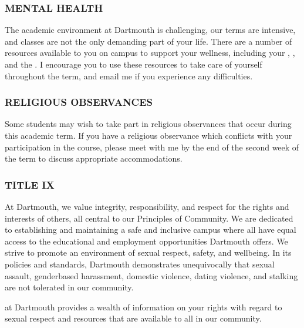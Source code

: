 \documentclass[letterpaper,10pt,english]{sphinxmanual}
\begin{document}
\subsubsection{MENTAL HEALTH}
\label{\detokenize{content/Syllabus:mental-health}}
The academic environment at Dartmouth is challenging, our terms are intensive, and classes are not the only demanding part of your life. There are a number of resources available to you on campus to support your wellness, including your , , and the . I encourage you to use these resources to take care of yourself throughout the term, and email me if you experience any difficulties.


\subsubsection{RELIGIOUS OBSERVANCES}
\label{\detokenize{content/Syllabus:religious-observances}}
Some students may wish to take part in religious observances that occur during this academic term. If you have a religious observance which conflicts with your participation in the course, please meet with me by the end of the second week of the term to discuss appropriate accommodations.


\subsubsection{TITLE IX}
\label{\detokenize{content/Syllabus:title-ix}}
At Dartmouth, we value integrity, responsibility, and respect for the rights and interests of others, all central to our Principles of Community. We are dedicated to establishing and maintaining a safe and inclusive campus where all have equal access to the educational and employment opportunities Dartmouth offers. We strive to promote an environment of sexual respect, safety, and well\sphinxhyphen{}being. In its policies and standards, Dartmouth demonstrates unequivocally that sexual assault, gender\sphinxhyphen{}based harassment, domestic violence, dating violence, and stalking are not tolerated in our community.

 at Dartmouth provides a wealth of information on your rights with regard to sexual respect and resources that are available to all in our community.
\end{document}
